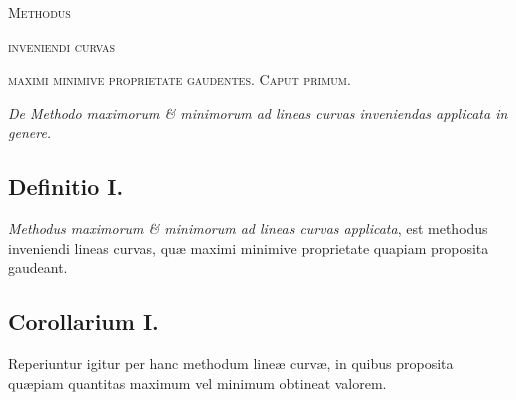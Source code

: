 \begin{center}
{\Large\textsc{Methodus}}\par\smallskip
{\large\textsc{inveniendi curvas}}\par
{\textsc{maximi minimive proprietate gaudentes.}}
\printerrule
{\Large\textsc{Caput primum.}}\par\medskip
\textit{De Methodo maximorum \& minimorum ad lineas curvas inveniendas applicata in genere.}
\end{center}
\subsection*{Definitio I.}
\textit{Methodus maximorum \& minimorum ad lineas curvas applicata}, est methodus inveniendi lineas curvas, quæ maximi minimive proprietate quapiam proposita gaudeant.
\subsection*{Corollarium I.}
Reperiuntur igitur per hanc methodum lineæ curvæ, in quibus proposita quæpiam quantitas maximum vel minimum obtineat valorem.
